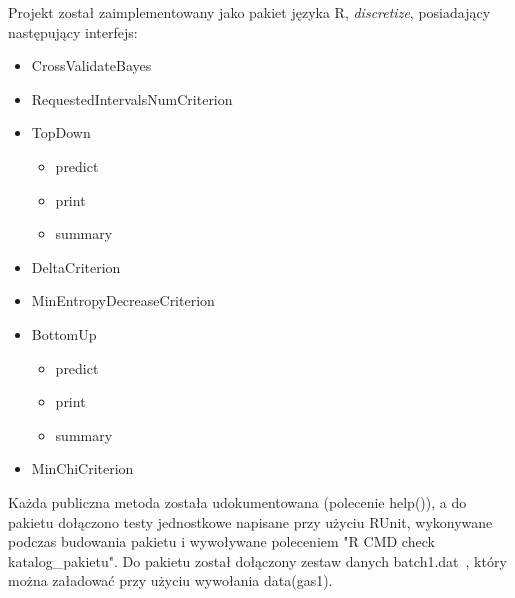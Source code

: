 Projekt został zaimplementowany jako pakiet języka R, \emph{discretize}, posiadający następujący interfejs:
\begin{itemize}
\item{CrossValidateBayes}
\item{RequestedIntervalsNumCriterion}
\item{TopDown}
	\begin{itemize}
	\item{predict}
	\item{print}
	\item{summary}
	\end{itemize}
\item{DeltaCriterion}
\item{MinEntropyDecreaseCriterion}
\item{BottomUp}
	\begin{itemize}
	\item{predict}
	\item{print}
	\item{summary}
	\end{itemize}
\item{MinChiCriterion}
\end{itemize}

\noindent Każda publiczna metoda została udokumentowana (polecenie help()), a do pakietu dołączono testy jednostkowe napisane przy użyciu RUnit, wykonywane podczas budowania pakietu i wywoływane poleceniem "R CMD check katalog\_pakietu". Do pakietu został dołączony zestaw danych batch1.dat~\cite{Gas:2012}, który można załadować przy użyciu wywołania data(gas1).
